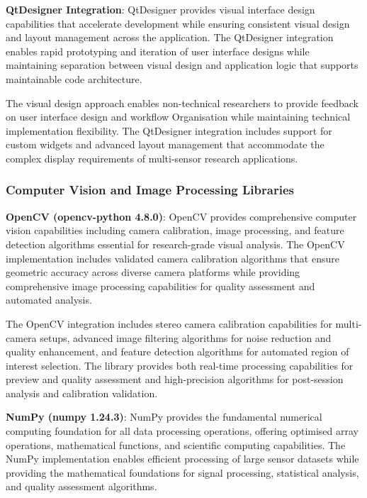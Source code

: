 \documentclass[11pt,a4paper]{report}
\begin{document}
\noindent \textbf{QtDesigner Integration}: QtDesigner provides visual interface design capabilities that accelerate development while ensuring consistent visual design and layout management across the application. The QtDesigner integration enables rapid prototyping and iteration of user interface designs while maintaining separation between visual design and application logic that supports maintainable code architecture.

The visual design approach enables non-technical researchers to provide feedback on user interface design and workflow Organisation while maintaining technical implementation flexibility. The QtDesigner integration includes support for custom widgets and advanced layout management that accommodate the complex display requirements of multi-sensor research applications.

\subsubsection{Computer Vision and Image Processing Libraries}

\noindent \textbf{OpenCV (opencv-python 4.8.0)}: OpenCV provides comprehensive computer vision capabilities including camera calibration, image processing, and feature detection algorithms essential for research-grade visual analysis. The OpenCV implementation includes validated camera calibration algorithms that ensure geometric accuracy across diverse camera platforms while providing comprehensive image processing capabilities for quality assessment and automated analysis.

The OpenCV integration includes stereo camera calibration capabilities for multi-camera setups, advanced image filtering algorithms for noise reduction and quality enhancement, and feature detection algorithms for automated region of interest selection. The library provides both real-time processing capabilities for preview and quality assessment and high-precision algorithms for post-session analysis and calibration validation.

\noindent \textbf{NumPy (numpy 1.24.3)}: NumPy provides the fundamental numerical computing foundation for all data processing operations, offering optimised array operations, mathematical functions, and scientific computing capabilities. The NumPy implementation enables efficient processing of large sensor datasets while providing the mathematical foundations for signal processing, statistical analysis, and quality assessment algorithms.
\end{document}
